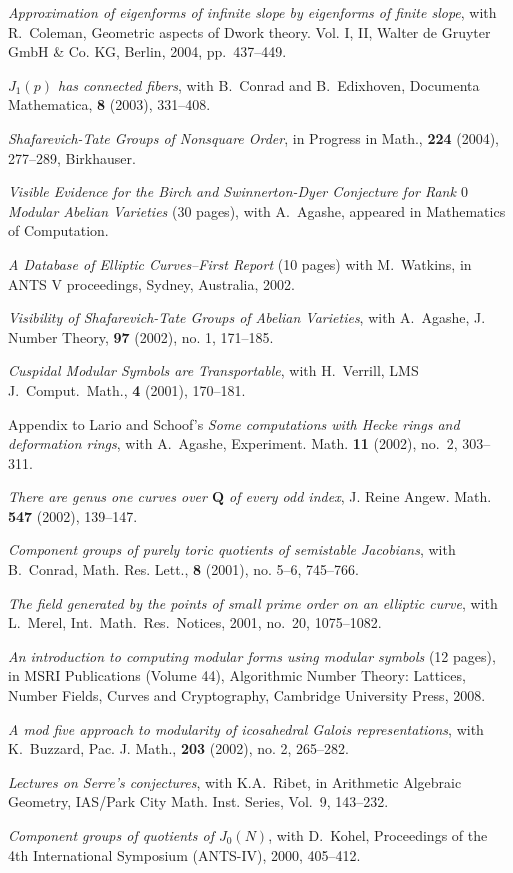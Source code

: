 \documentclass[10pt]{article}
\newcommand{\ptitle}{\em}
\newcounter{totalnumpapers}
\newenvironment{papers}
   {
   \begin{revnumerate}[\value{totalnumpapers}]
   {}
         {
            \setlength{\itemsep}{.5ex}
            \setlength{\parsep}{0ex}
            \setlength{\leftmargin}{0em}
            \setlength{\parskip}{0ex}
            \setlength{\topsep}{0ex}
         }
   }
   {
\end{revnumerate}
   }
\newcommand{\marginlabel}[1]{
\begin{minipage}[b]{0.8\labelwidth}{\large \textsf{\textbf{#1}}}\end{minipage}}
\newcommand{\entrylabel}[1]{\mbox{\marginlabel{#1}}\hfill}
\newcommand{\MainListlabel}[1]
   {
      \parbox[t]{\labelwidth}{\hspace{.8em}\marginlabel{#1}}
   }
\newenvironment{MainList}[1]
   {
      \renewcommand{\entrylabel}{\MainListlabel}
      \begin{list}{}
      {
         \renewcommand{\makelabel}{\entrylabel}
         \setlength   {\itemindent}{-.65em}
         \setlength   {\labelwidth}{#1}
         \setlength   {\leftmargin}{\labelwidth}
         \setlength   {\itemsep}{3ex}
      }
   }
   {
      \end{list}
   }
\begin{document}
\begin{MainList}{88pt}
\begin{papers}
 \item \emph{Approximation of eigenforms of infinite slope by
     eigenforms of finite slope}, with R.~Coleman, Geometric aspects
   of {D}work theory. {V}ol. {I}, {II}, Walter de Gruyter GmbH \&
   Co. KG, Berlin, 2004, pp.~437--449.

  \item {\ptitle $J_1(p)$ has connected fibers}, with B.~Conrad and
    B.~Edixhoven, Documenta Mathematica, {\bf 8} (2003), 331--408.
  \item {\ptitle Shafarevich-Tate Groups of Nonsquare Order},
  in  Progress in Math., {\bf 224} (2004), 277--289, Birkhauser.
  \item {\ptitle Visible Evidence for the Birch and Swinnerton-Dyer
Conjecture for Rank $0$ Modular Abelian Varieties} (30 pages),
with A.~Agashe, appeared in Mathematics of Computation.
  \item {\ptitle A Database of Elliptic Curves--First Report}
(10 pages) with M.~Watkins, in ANTS V proceedings, Sydney, Australia, 2002.
  \item {\ptitle Visibility of Shafarevich-Tate  Groups
    of Abelian Varieties}, with A.~Agashe,  J. Number Theory,  {\bf 97}
  (2002),  no. 1, 171--185.
  \item {\ptitle Cuspidal Modular Symbols are Transportable}, with H.~Verrill,
   LMS J.\ Comput.\ Math., {\bf 4} (2001), 170--181.
\item Appendix to Lario and Schoof's {\ptitle Some computations
    with Hecke rings and deformation rings}, with A.~Agashe,
     Experiment. Math. {\bf 11} (2002), no.~2, 303--311.
  \item {\ptitle There are genus one curves over $\mathbf{Q}$
         of every odd index}, J. Reine Angew. Math. {\bf 547}
(2002), 139--147.
  \item {\ptitle Component groups of purely toric quotients of
semistable Jacobians}, with B.~Conrad, Math. Res. Lett.,  {\bf
8}  (2001),  no. 5--6, 745--766.
  \item {\ptitle The field generated by the points of small prime
       order on an elliptic curve}, with L.~Merel,
       Int.\ Math.\ Res.\ Notices,  2001, no.~20, 1075--1082.
  \item {\ptitle An introduction to computing modular forms using
modular symbols} (12 pages), in MSRI Publications (Volume 44),
Algorithmic Number Theory: Lattices, Number Fields, Curves
and Cryptography, Cambridge University Press, 2008.
  \item {\ptitle A mod five approach to modularity of icosahedral Galois
         representations}, with K.~Buzzard, Pac. J.
Math.,  {\bf 203}  (2002),  no. 2, 265--282.%
  \item {\ptitle Lectures on Serre's conjectures},
     with K.\thinspace{}A.~Ribet,
     in Arithmetic Algebraic Geometry, IAS/Park City Math.
     Inst. Series, Vol.~9, 143--232.
  \item {\ptitle Component groups of quotients of $J_0(N)$},
     with D.~Kohel,   Proceedings of the 4th International
     Symposium (ANTS-IV), 2000, 405--412.


\end{papers}
\end{MainList}
\end{document}
